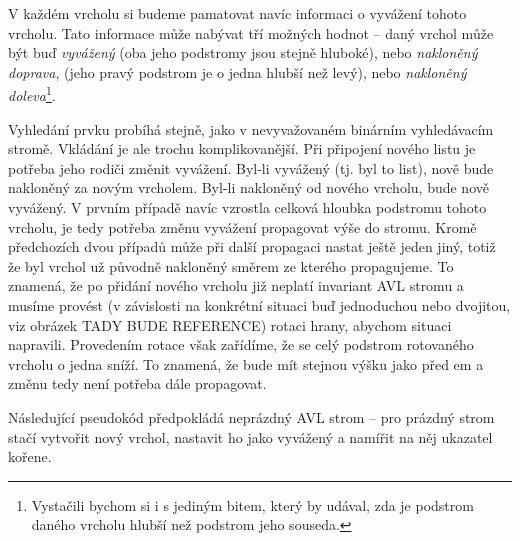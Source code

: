 V každém vrcholu si budeme pamatovat navíc informaci o vyvážení tohoto vrcholu.
Tato informace může nabývat tří možných hodnot -- daný vrchol může být buď
\emph{vyvážený} (oba jeho podstromy jsou stejně hluboké), nebo \emph{nakloněný
doprava}, (jeho pravý podstrom je o jedna hlubší než levý), nebo
\emph{nakloněný doleva}\footnote{Vystačili bychom si i s jediným bitem, který by udával, zda je podstrom daného vrcholu hlubší než podstrom jeho souseda.}.

Vyhledání prvku probíhá stejně, jako v nevyvažovaném binárním vyhledávacím stromě. 
Vkládání je ale trochu komplikovanější. Při připojení nového listu je potřeba
jeho rodiči změnit vyvážení. Byl-li vyvážený (tj. byl to list), nově bude
nakloněný za novým vrcholem. Byl-li nakloněný od nového vrcholu, bude nově
vyvážený. V prvním případě navíc vzrostla celková hloubka podstromu tohoto
vrcholu, je tedy potřeba změnu vyvážení propagovat výše do stromu. Kromě
předchozích dvou případů  může při další propagaci nastat ještě jeden jiný,
totiž že byl vrchol už původně nakloněný směrem ze kterého propagujeme. To
znamená, že po přidání nového vrcholu již neplatí invariant AVL stromu a musíme
provést (v závislosti na konkrétní situaci buď jednoduchou nebo dvojitou, viz
obrázek TADY BUDE REFERENCE) rotaci hrany, abychom situaci napravili.
Provedením rotace však zařídíme, že se celý podstrom rotovaného vrcholu o jedna
sníží. To znamená, že bude mít stejnou výšku jako před em a změnu tedy
není potřeba dále propagovat.   

Následující pseudokód předpokládá neprázdný
AVL strom -- pro prázdný strom stačí vytvořit nový vrchol, nastavit ho jako vyvážený a namířit na něj ukazatel kořene.



